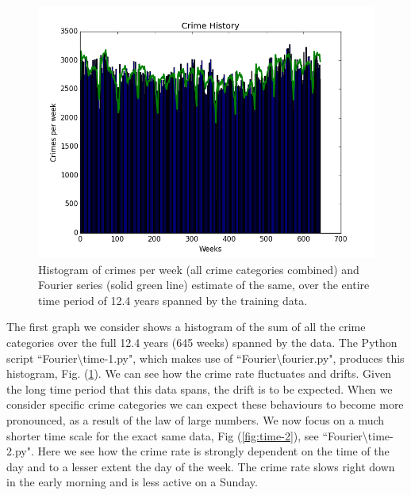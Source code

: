 \documentclass[12pt,notitlepage]{article}
\begin{document}
\begin{figure}
\centering{}\includegraphics[scale=0.7]{time-1}\caption{ Histogram of crimes per week (all crime categories combined) and Fourier series (solid green line) estimate of the same, over the entire time period of 12.4 years spanned by the training data.\label{fig:time-1}}
\end{figure}
%
The first graph we consider shows a histogram of the sum of all the crime categories over the full 12.4 years (645 weeks) spanned by the data. The Python script ``Fourier\textbackslash time-1.py", which makes use of ``Fourier\textbackslash fourier.py", produces this histogram, Fig. (\ref{fig:time-1}). We can see how the crime rate fluctuates and drifts. Given the long time period that this data spans, the drift is to be expected. When we consider specific crime categories we can expect these behaviours to become more pronounced, as a result of the law of large numbers. We now focus on a much shorter time scale for the exact same data, Fig (\ref{fig:time-2}), see ``Fourier\textbackslash time-2.py". Here we see how the crime rate is strongly dependent on the time of the day and to a lesser extent the day of the week. The crime rate slows right down in the early morning and is less active on a Sunday.
%
\end{document}

